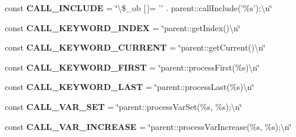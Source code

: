 \begin{DoxyCompactItemize}
\item 
\hypertarget{class_i_p_c_o___parser_settings_aedfb5f267508fba79e3d364e5f83ab45}{const {\bfseries C\-A\-L\-L\-\_\-\-I\-N\-C\-L\-U\-D\-E} = \char`\"{}\textbackslash{}\$\-\_\-ob \mbox{[}$\,$\mbox{]}= '' . parent\-::call\-Include('\%s');\textbackslash{}n\char`\"{}}\label{class_i_p_c_o___parser_settings_aedfb5f267508fba79e3d364e5f83ab45}

\item 
\hypertarget{class_i_p_c_o___parser_settings_a8dde2198861e17e3b4127277c406b101}{const {\bfseries C\-A\-L\-L\-\_\-\-K\-E\-Y\-W\-O\-R\-D\-\_\-\-I\-N\-D\-E\-X} = \char`\"{}parent\-::get\-Index()\textbackslash{}n\char`\"{}}\label{class_i_p_c_o___parser_settings_a8dde2198861e17e3b4127277c406b101}

\item 
\hypertarget{class_i_p_c_o___parser_settings_a6102f52955d8aa2c55a92476eb6388bf}{const {\bfseries C\-A\-L\-L\-\_\-\-K\-E\-Y\-W\-O\-R\-D\-\_\-\-C\-U\-R\-R\-E\-N\-T} = \char`\"{}parent\-::get\-Current()\textbackslash{}n\char`\"{}}\label{class_i_p_c_o___parser_settings_a6102f52955d8aa2c55a92476eb6388bf}

\item 
\hypertarget{class_i_p_c_o___parser_settings_a8e47c7e1f200470e1ec5f87de71c17f8}{const {\bfseries C\-A\-L\-L\-\_\-\-K\-E\-Y\-W\-O\-R\-D\-\_\-\-F\-I\-R\-S\-T} = \char`\"{}parent\-::process\-First(\%s)\textbackslash{}n\char`\"{}}\label{class_i_p_c_o___parser_settings_a8e47c7e1f200470e1ec5f87de71c17f8}

\item 
\hypertarget{class_i_p_c_o___parser_settings_a783dbdab2da6290e44b1cd790370b0a2}{const {\bfseries C\-A\-L\-L\-\_\-\-K\-E\-Y\-W\-O\-R\-D\-\_\-\-L\-A\-S\-T} = \char`\"{}parent\-::process\-Last(\%s)\textbackslash{}n\char`\"{}}\label{class_i_p_c_o___parser_settings_a783dbdab2da6290e44b1cd790370b0a2}

\item 
\hypertarget{class_i_p_c_o___parser_settings_a80c64e808d926f3b98a70d3042446145}{const {\bfseries C\-A\-L\-L\-\_\-\-V\-A\-R\-\_\-\-S\-E\-T} = \char`\"{}parent\-::process\-Var\-Set(\%s, \%s);\textbackslash{}n\char`\"{}}\label{class_i_p_c_o___parser_settings_a80c64e808d926f3b98a70d3042446145}

\item 
\hypertarget{class_i_p_c_o___parser_settings_aa1aeb2f99061fb1e0a4519e836eda937}{const {\bfseries C\-A\-L\-L\-\_\-\-V\-A\-R\-\_\-\-I\-N\-C\-R\-E\-A\-S\-E} = \char`\"{}parent\-::process\-Var\-Increase(\%s, \%s);\textbackslash{}n\char`\"{}}\label{class_i_p_c_o___parser_settings_aa1aeb2f99061fb1e0a4519e836eda937}


\end{DoxyCompactItemize}
